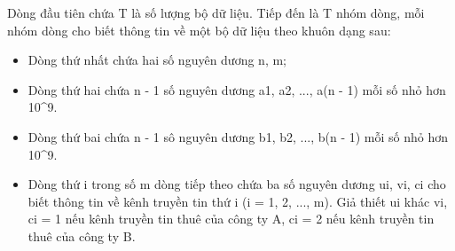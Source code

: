 Dòng đầu tiên chứa T là số lượng bộ dữ liệu. Tiếp đến là T nhóm dòng, mỗi nhóm dòng cho biết thông tin về một bộ dữ liệu theo khuôn dạng sau:
\begin{itemize}
	\item Dòng thứ nhất chứa hai số nguyên dương n, m;
	\item Dòng thứ hai chứa n - 1 số nguyên dương a1, a2, ..., a(n - 1) mỗi số nhỏ hơn 10^9.
	\item Dòng thứ bai chứa n - 1 sô nguyên dương b1, b2, ..., b(n - 1) mỗi số nhỏ hơn 10^9.
	\item Dòng thứ i trong số m dòng tiếp theo chứa ba số nguyên dương ui, vi, ci cho biết thông tin về kênh truyền tin thứ i (i = 1, 2, ..., m). Giả thiết ui khác vi, ci = 1 nếu kênh truyền tin thuê của công ty A, ci = 2 nếu kênh truyền tin thuê của công ty B.
\end{itemize}